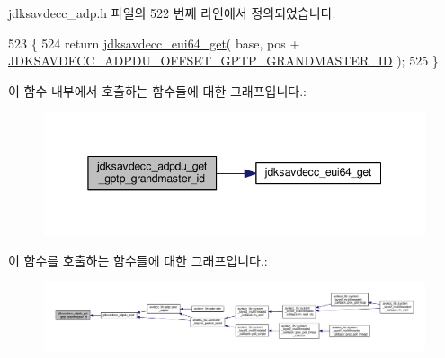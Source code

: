 jdksavdecc\+\_\+adp.\+h 파일의 522 번째 라인에서 정의되었습니다.


\begin{DoxyCode}
523 \{
524     \textcolor{keywordflow}{return} \hyperlink{group__eui64_ga2652311a25a6b91cddbed75c108c7031}{jdksavdecc\_eui64\_get}( base, pos + 
      \hyperlink{group__adpdu_ga383e7da9e60bd4571e3b50d6e2fbdec2}{JDKSAVDECC\_ADPDU\_OFFSET\_GPTP\_GRANDMASTER\_ID} );
525 \}
\end{DoxyCode}


이 함수 내부에서 호출하는 함수들에 대한 그래프입니다.\+:
\nopagebreak
\begin{figure}[H]
\begin{center}
\leavevmode
\includegraphics[width=345pt]{group__adpdu_ga43b71d01d07b468523243f5a0d198094_cgraph}
\end{center}
\end{figure}




이 함수를 호출하는 함수들에 대한 그래프입니다.\+:
\nopagebreak
\begin{figure}[H]
\begin{center}
\leavevmode
\includegraphics[width=350pt]{group__adpdu_ga43b71d01d07b468523243f5a0d198094_icgraph}
\end{center}
\end{figure}


